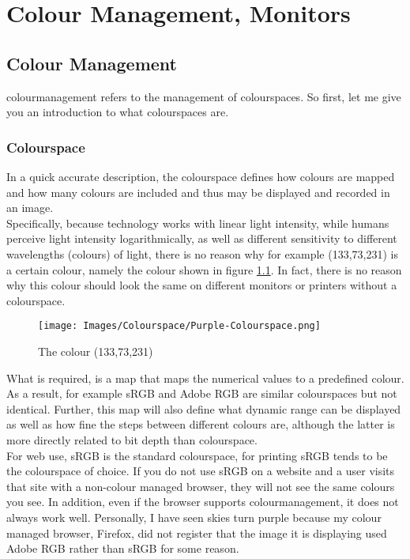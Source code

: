 \chapter{Colour Management, Monitors}
\label{chap:Colour-Management}


\section{Colour Management}
\label{sec:colour-management}

\Gls{colourmanagement} refers to the management of \glspl{colourspace}. So first, let me give you an introduction to what \glspl{colourspace} are.

\subsection{Colourspace}
\label{subsec:colourspace}

In a quick accurate description, the \gls{colourspace} defines how colours are mapped and how many colours are included and thus may be displayed and recorded in an image.
\\
Specifically, because technology works with linear light intensity, while humans perceive light intensity logarithmically, as well as different sensitivity to different wavelengths (colours) of light, there is no reason why for example (133,73,231) is a certain colour, namely the colour shown in figure \ref{fig:Purple-Colourspace}. In fact, there is no reason why this colour should look the same on different monitors or printers without a \gls{colourspace}.

\begin{figure}[h]
	\centering
		\texttt{[image: Images/Colourspace/Purple-Colourspace.png]}
	\caption{The colour (133,73,231)}
	\label{fig:Purple-Colourspace}
\end{figure}

What is required, is a map that maps the numerical values to a predefined colour. As a result, for example sRGB and Adobe RGB are similar \glspl{colourspace} but not identical. Further, this map will also define what dynamic range can be displayed as well as how fine the steps between different colours are, although the latter is more directly related to bit depth than \gls{colourspace}.
\\
For web use, sRGB is the standard \gls{colourspace}, for printing sRGB tends to be the \gls{colourspace} of choice. If you do not use sRGB on a website and a user visits that site with a non-colour managed browser, they will not see the same colours you see. In addition, even if the browser supports \gls{colourmanagement}, it does not always work well. Personally, I have seen skies turn purple because my colour managed browser, Firefox, did not register that the image it is displaying used Adobe RGB rather than sRGB for some reason.


